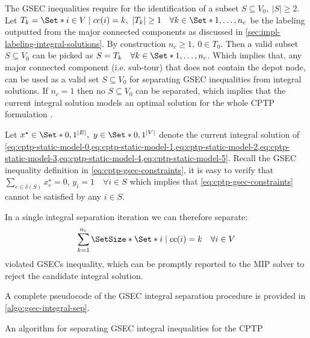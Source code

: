 The GSEC inequalities require for the identification of a subset $S \subseteq V_0,\ |S| \ge 2$.
Let $T_k  = \Set*{i \in V \mid cc(i) = k},\ |T_k| \ge 1 \quad \forall k \in \Set*{1, \dots, n_c}$ be the labeling
outputted from the major connected components as discussed in \cref{sec:impl-labeling-integral-solutions}.
By construction $n_c \ge 1,\ 0 \in T_0$.
Then a valid subset $S \subseteq V_0$ can be picked as $S = T_k \quad \forall k \in \Set*{1, \dots, n_c}$.
Which implies that,
any major connected component (i.e. sub-tour) that does not contain the depot node,
can be used as a valid set $S \subseteq V_0$ for separating GSEC inequalities from integral solutions.
If $n_c = 1$ then no $S \subseteq V_0$ can be separated,
which implies that the current integral solution models an optimal solution for the whole CPTP formulation
.

Let $x^\star \in \Set*{0, 1}^{|E|},\ y \in \Set*{0, 1}^{|V|}$ denote the
current integral solution of
\cref{eq:cptp-static-model-0,eq:cptp-static-model-1,eq:cptp-static-model-2,eq:cptp-static-model-3,eq:cptp-static-model-4,eq:cptp-static-model-5}.
Recall the GSEC inequality definition in \cref{eq:cptp-gsec-constraints},
it is easy to verify that
$\sum_{e \in \delta(S)} x^\star_{e} = 0$, $y_i =  1 \quad \forall i \in S$
which implies that \cref{eq:cptp-gsec-constraints} cannot be satisfied by any $i \in S$.

\medskip

In a single integral separation iteration we can therefore separate:
\begin{equation}
	\sum^{n_c}_{k = 1} \SetSize*{ \Set*{ i \mid cc(i) = k \quad \forall i \in V } }
\end{equation}
violated GSECs inequality, which can be promptly reported to the MIP solver to reject the candidate integral solution.

A complete pseudocode of the GSEC integral separation procedure is provided in \cref{algo:gsec-integral-sep}.

\begin{algorithm}
	\caption{An algorithm for separating GSEC integral inequalities for the CPTP}
	\label{algo:gsec-integral-sep}
	
\end{algorithm}

